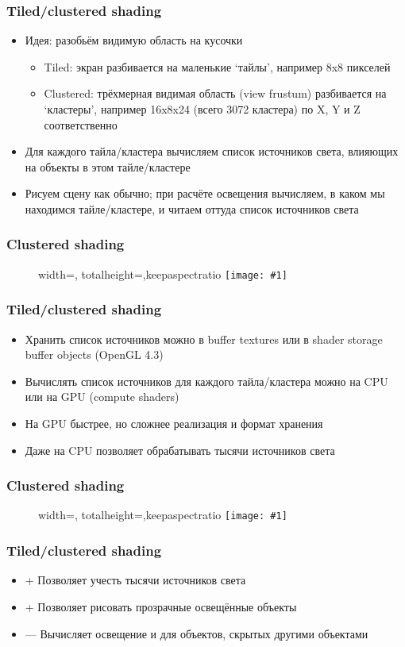 \documentclass{beamer}
\newcommand{\slideimage}[1]{
  \begin{figure}
    \begin{adjustbox}{width=\textwidth, totalheight=\textheight-2\baselineskip-2\baselineskip,keepaspectratio}
      \texttt{[image: \#1]}
    \end{adjustbox}
  \end{figure}
}
\begin{document}
\begin{frame}[fragile]
\frametitle{Tiled/clustered shading}
\begin{itemize}
\item Идея: разобьём видимую область на кусочки
\begin{itemize}
\item Tiled: экран разбивается на маленькие `тайлы', например 8x8 пикселей
\item Clustered: трёхмерная видимая область (view frustum) разбивается на `кластеры', например 16x8x24 (всего 3072 кластера) по X, Y и Z соответственно
\end{itemize}
\pause
\item Для каждого тайла/кластера вычисляем список источников света, влияющих на объекты в этом тайле/кластере
\pause
\item Рисуем сцену как обычно; при расчёте освещения вычисляем, в каком мы находимся тайле/кластере, и читаем оттуда список источников света
\end{itemize}
\end{frame}

\begin{frame}[fragile]
\frametitle{Clustered shading}
\slideimage{clustered.png}
\end{frame}

\begin{frame}[fragile]
\frametitle{Tiled/clustered shading}
\begin{itemize}
\item Хранить список источников можно в buffer textures или в shader storage buffer objects (OpenGL 4.3)
\pause
\item Вычислять список источников для каждого тайла/кластера можно на CPU или на GPU (compute shaders)
\pause
\item На GPU быстрее, но сложнее реализация и формат хранения
\pause
\item Даже на CPU позволяет обрабатывать тысячи источников света
\end{itemize}
\end{frame}

\begin{frame}[fragile]
\frametitle{Clustered shading}
\slideimage{clustered_mars.png}
\end{frame}

\begin{frame}[fragile]
\frametitle{Tiled/clustered shading}
\begin{itemize}
\item {\color{green}+} Позволяет учесть тысячи источников света
\item {\color{green}+} Позволяет рисовать прозрачные освещённые объекты
\item {\color{red}—} Вычисляет освещение и для объектов, скрытых другими объектами
\end{itemize}
\end{frame}
\end{document}
